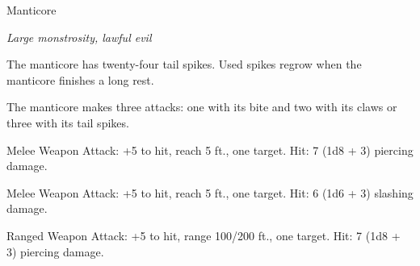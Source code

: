 \begin{monsterbox}{Manticore}
\begin{hangingpar}
\textit{Large monstrosity, lawful evil}
\end{hangingpar}
\dndline%
\basics[%
armorclass = 14,
hitpoints = 8d10 + 24,
speed = {30 ft., fly 50 ft.}
]
\dndline%
\stats[%
STR = \stat{17},
DEX = \stat{16},
CON = \stat{17},
INT = \stat{7},
WIS = \stat{12},
CHA = \stat{8}
]
\dndline%
\details[%
skills={},
damageimmunities={},
savingthrows={},
conditionimmunities={},
damageresistances={},
damagevulnerabilities={},
senses={darkvision 60 ft., passive Perception 11},
challenge=3
]
\dndline%
\begin{monsteraction}
The manticore has twenty-four tail spikes. Used spikes regrow when the manticore finishes a long rest.
\end{monsteraction}
\begin{monsteraction}[Multiattack]
The manticore makes three attacks: one with its bite and two with its claws or three with its tail spikes.
\end{monsteraction}
\begin{monsteraction}[Bite]
Melee Weapon Attack: +5 to hit, reach 5 ft., one target. Hit: 7 (1d8 + 3) piercing damage.
\end{monsteraction}
\begin{monsteraction}[Claw]
Melee Weapon Attack: +5 to hit, reach 5 ft., one target. Hit: 6 (1d6 + 3) slashing damage.
\end{monsteraction}
\begin{monsteraction}
Ranged Weapon Attack: +5 to hit, range 100/200 ft., one target. Hit: 7 (1d8 + 3) piercing damage.
\end{monsteraction}
\end{monsterbox}
